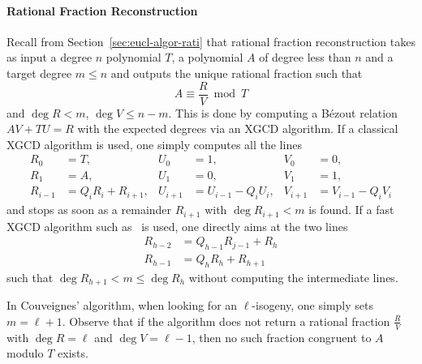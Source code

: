 \paragraph{Rational Fraction Reconstruction}
Recall from Section~\ref{sec:eucl-algor-rati} that rational fraction
reconstruction takes as input a degree $n$ polynomial $T$, a
polynomial $A$ of degree less than $n$ and a target degree $m\le n$
and outputs the unique rational fraction such that
\begin{equation*}
  A \equiv \frac{R}{V} \bmod T
\end{equation*}
and $\deg R < m$, $\deg V \le n-m$. This is done by computing a Bézout
relation $AV + TU = R$ with the expected degrees via an XGCD
algorithm. If a classical XGCD algorithm is used, one simply computes
all the lines
\begin{equation}
  \label{eq:XGCD}
  \begin{aligned}
    R_0 &= T, & U_0 &= 1, & V_0 &= 0,\\
    R_1 &= A, & U_1 &= 0, & V_1 &= 1,\\
    R_{i-1} &= Q_iR_i + R_{i+1}, & U_{i+1} &= U_{i-1}-Q_iU_i, & V_{i+1} &= V_{i-1}-Q_iV_i
  \end{aligned}
\end{equation}
and stops as soon as a remainder $R_{i+1}$ with $\deg R_{i+1}<m$ is
found. If a fast XGCD algorithm such as~\cite[$\S$11.1]{vzGG} is used,
one directly aims at the two lines
\begin{equation}
  \label{eq:FastGCD}
  \begin{aligned}
    R_{h-2} &= Q_{h-1}R_{j-1} + R_h\\
    R_{h-1} &= Q_hR_h + R_{h+1}
  \end{aligned}
\end{equation}
such that $\deg R_{h+1} < m \le \deg R_h$ without computing the
intermediate lines.

In Couveignes' algorithm, when looking for an $\ell$-isogeny, one
simply sets $m=\ell+1$. Observe that if the algorithm does not return
a rational fraction $\frac{R}{V}$ with $\deg R = \ell$ and $\deg V =
\ell -1 $, then no such fraction congruent to $A$ modulo $T$ exists.

